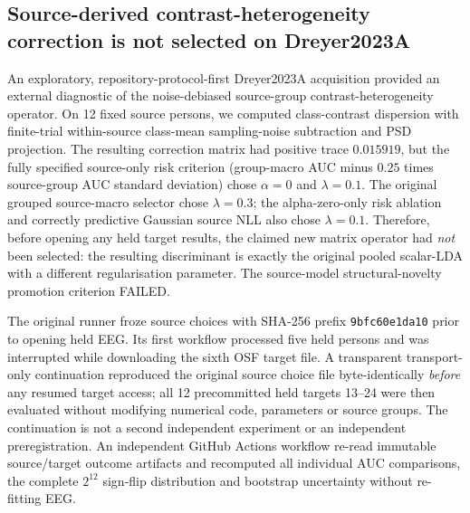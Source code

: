 \subsection{Source-derived contrast-heterogeneity correction is not selected on Dreyer2023A}
\label{sec:v32-dreyer-negative}
An exploratory, repository-protocol-first Dreyer2023A acquisition
provided an external diagnostic of the noise-debiased
source-group contrast-heterogeneity operator.
On 12 fixed source persons, we computed class-contrast
dispersion with finite-trial within-source class-mean
sampling-noise subtraction and PSD projection.
The resulting correction matrix had positive trace
$0.015919$, but the fully specified source-only
risk criterion (group-macro AUC minus $0.25$ times
source-group AUC standard deviation) chose
$\alpha=0$ and $\lambda=0.1$.
The original grouped source-macro selector chose
$\lambda=0.3$; the alpha-zero-only risk ablation
and correctly predictive Gaussian source NLL also
chose $\lambda=0.1$.
Therefore, before opening any held target results,
the claimed new matrix operator had \emph{not} been
selected: the resulting discriminant is exactly
the original pooled scalar-LDA with a different
regularisation parameter. The source-model
structural-novelty promotion criterion FAILED.

The original runner froze source choices with SHA-256 prefix
\texttt{9bfc60e1da10} prior to opening held EEG.
Its first workflow processed five held persons and
was interrupted while downloading the sixth OSF
target file. A transparent transport-only continuation
reproduced the original source choice file byte-identically
\emph{before} any resumed target access; all 12 precommitted
held targets 13--24 were then evaluated without modifying
numerical code, parameters or source groups.
The continuation is not a second independent
experiment or an independent preregistration.
An independent GitHub Actions workflow re-read
immutable source/target outcome artifacts and
recomputed all individual AUC comparisons, the
complete $2^{12}$ sign-flip distribution and
bootstrap uncertainty without re-fitting EEG.

